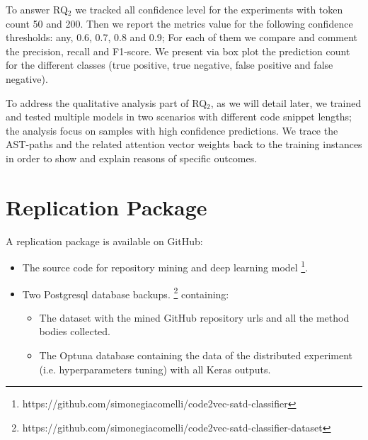 To answer RQ$_2$ we tracked all confidence level for the experiments with token count 50 and 200. Then we report the metrics value for the following confidence thresholds: any, 0.6, 0.7, 0.8 and 0.9; For each of them we compare and comment the precision, recall and F1-score. We present via box plot the prediction count for the different classes (true positive, true negative, false positive and false negative). 

To address the qualitative analysis part of RQ$_2$, as we will detail later, we trained and tested multiple models in two scenarios with different code snippet lengths; the analysis focus on samples with high confidence predictions. We trace the AST-paths and the related attention vector weights back to the training instances in order to show and explain reasons of specific outcomes.



\section{Replication Package}
A replication package is available on GitHub:
\begin{itemize}
    \item The source code for repository mining and deep learning model \footnote{https://github.com/simonegiacomelli/code2vec-satd-classifier}. 
    \item Two Postgresql database backups. \footnote{https://github.com/simonegiacomelli/code2vec-satd-classifier-dataset } containing:
    \begin{itemize}
\item The dataset with the mined GitHub repository urls and all the method bodies collected.
\item The Optuna database containing the data of the distributed experiment (i.e. hyperparameters tuning) with all Keras outputs. 
\end{itemize}
\end{itemize}
